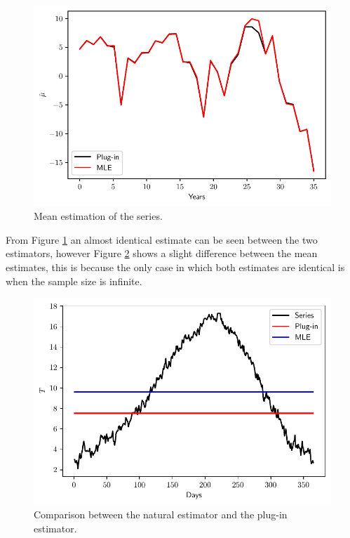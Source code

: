 \documentclass[11pt]{article}
\theoremstyle{definition}
\theoremstyle{remark}
\theoremstyle{remark}
\begin{document}
\begin{figure}[H]
    \centering
    \includegraphics[scale=.5]{../figs/means.pdf}
    \caption{Mean estimation of the series.}
    \label{fig:plug-in}
\end{figure}

From Figure \ref{fig:plug-in} an almost identical estimate can be seen
between the two estimators, however Figure \ref{fig:comparision} shows
a slight difference between the mean estimates, this is because the
only case in which both estimates are identical is when the sample
size is infinite.


\begin{figure}[H]
    \centering
    \includegraphics[scale=.5]{../figs/mle-vs-plugin.pdf}
    \caption{Comparison between the natural estimator and the plug-in estimator.}
    \label{fig:comparision}
\end{figure}
\end{document}
